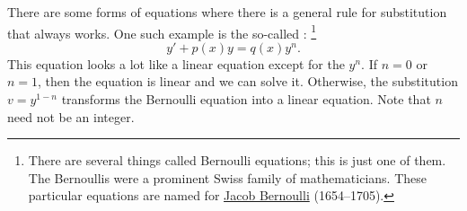 There are some forms of equations where there is a
general rule for substitution that always works.
One such example is the so-called
\emph{}:%
\footnote{There are several things called Bernoulli equations; this is just one
of them.  The Bernoullis were a prominent Swiss family of mathematicians.  These
particular equations are named for
\href{https://en.wikipedia.org/wiki/Jacob_Bernoulli}{Jacob Bernoulli} (1654--1705).}
\begin{equation*}
y' + p(x)y = q(x)y^n .
\end{equation*}
This equation
looks a lot like a linear equation except for the $y^n$.  If $n=0$ or
$n=1$, then the equation is linear and we can solve it.  Otherwise,
the substitution $v=y^{1-n}$ transforms the
Bernoulli equation into a linear equation.  Note that $n$
need not be an integer.

